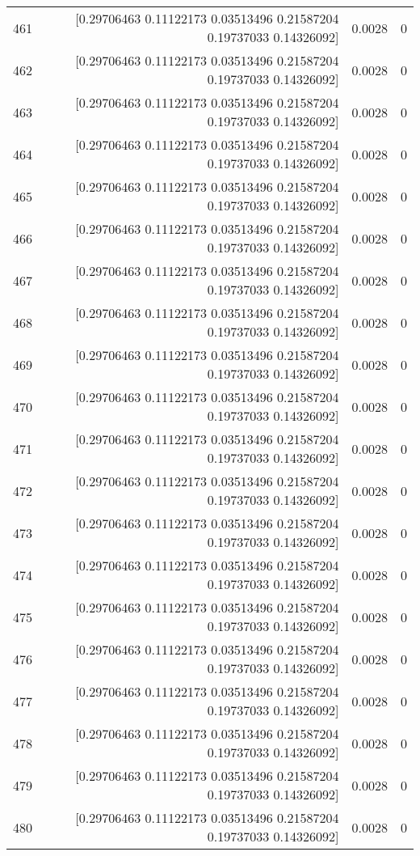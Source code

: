 \begin{longtable}{lrrr}
461 & [0.29706463 0.11122173 0.03513496 0.21587204 0.19737033 0.14326092] & 0.0028 & 0 \\
462 & [0.29706463 0.11122173 0.03513496 0.21587204 0.19737033 0.14326092] & 0.0028 & 0 \\
463 & [0.29706463 0.11122173 0.03513496 0.21587204 0.19737033 0.14326092] & 0.0028 & 0 \\
464 & [0.29706463 0.11122173 0.03513496 0.21587204 0.19737033 0.14326092] & 0.0028 & 0 \\
465 & [0.29706463 0.11122173 0.03513496 0.21587204 0.19737033 0.14326092] & 0.0028 & 0 \\
466 & [0.29706463 0.11122173 0.03513496 0.21587204 0.19737033 0.14326092] & 0.0028 & 0 \\
467 & [0.29706463 0.11122173 0.03513496 0.21587204 0.19737033 0.14326092] & 0.0028 & 0 \\
468 & [0.29706463 0.11122173 0.03513496 0.21587204 0.19737033 0.14326092] & 0.0028 & 0 \\
469 & [0.29706463 0.11122173 0.03513496 0.21587204 0.19737033 0.14326092] & 0.0028 & 0 \\
470 & [0.29706463 0.11122173 0.03513496 0.21587204 0.19737033 0.14326092] & 0.0028 & 0 \\
471 & [0.29706463 0.11122173 0.03513496 0.21587204 0.19737033 0.14326092] & 0.0028 & 0 \\
472 & [0.29706463 0.11122173 0.03513496 0.21587204 0.19737033 0.14326092] & 0.0028 & 0 \\
473 & [0.29706463 0.11122173 0.03513496 0.21587204 0.19737033 0.14326092] & 0.0028 & 0 \\
474 & [0.29706463 0.11122173 0.03513496 0.21587204 0.19737033 0.14326092] & 0.0028 & 0 \\
475 & [0.29706463 0.11122173 0.03513496 0.21587204 0.19737033 0.14326092] & 0.0028 & 0 \\
476 & [0.29706463 0.11122173 0.03513496 0.21587204 0.19737033 0.14326092] & 0.0028 & 0 \\
477 & [0.29706463 0.11122173 0.03513496 0.21587204 0.19737033 0.14326092] & 0.0028 & 0 \\
478 & [0.29706463 0.11122173 0.03513496 0.21587204 0.19737033 0.14326092] & 0.0028 & 0 \\
479 & [0.29706463 0.11122173 0.03513496 0.21587204 0.19737033 0.14326092] & 0.0028 & 0 \\
480 & [0.29706463 0.11122173 0.03513496 0.21587204 0.19737033 0.14326092] & 0.0028 & 0 \\

\end{longtable}
